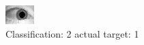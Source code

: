 \begin{figure}[h!]
\begin{center}
\includegraphics[width=0.60\columnwidth]{figures/ID1531_class_2_target_1.png}
\end{center}
\caption{ Classification: 2 actual target: 1}
\label{fig:ID1531_class_2_target_1}
\end{figure}
